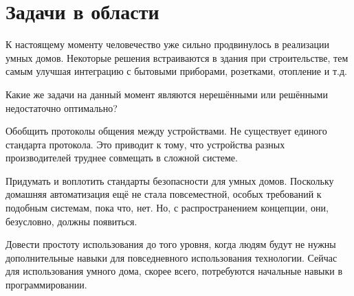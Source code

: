 \section{Задачи в области}

К настоящему моменту человечество уже сильно продвинулось в реализации умных домов.
Некоторые решения встраиваются в здания при строительстве, тем самым улучшая интеграцию с бытовыми приборами, розетками, отопление и т.д.

Какие же задачи на данный момент являются нерешёнными или решёнными недостаточно оптимально?
\begin{list}{}{}
    \item Обобщить протоколы общения между устройствами. Не существует единого стандарта протокола. Это приводит к тому, что устройства разных производителей труднее совмещать в сложной системе.
    \item Придумать и воплотить стандарты безопасности для умных домов. Поскольку домашняя автоматизация ещё не стала повсеместной, особых требований к подобным системам, пока что, нет. Но, с распространением концепции, они, безусловно, должны появиться.
    \item Довести простоту использования до того уровня, когда людям будут не нужны дополнительные навыки для повседневного использования технологии. Сейчас для использования умного дома, скорее всего, потребуются начальные навыки в программировании.
\end{list}
